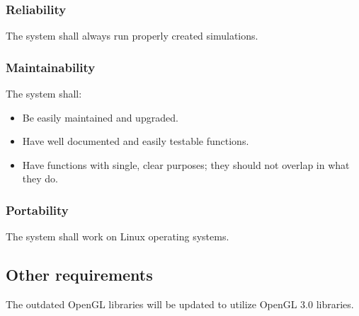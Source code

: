 \documentclass[10pt,journal,compsoc]{IEEEtran}
\begin{document}
\begin{flushleft}
\subsubsection{Reliability}
\vspace{5mm}
The system shall always run properly created simulations.


\subsubsection{Maintainability}
\vspace{3mm}
The system shall:
\begin{itemize}
\item Be easily maintained and upgraded. 
\item Have well documented and easily testable functions.
\item Have functions with single, clear purposes; they should not overlap in what they do.
\end{itemize}

\subsubsection{Portability}
\vspace{3mm}
The system shall work on Linux operating systems.

\subsection{Other requirements}
\vspace{3mm}
The outdated OpenGL libraries will be updated to utilize OpenGL 3.0 libraries.

\vfill

\newpage

\begin{landscape}

\end{landscape}
\end{flushleft}
\end{document}
